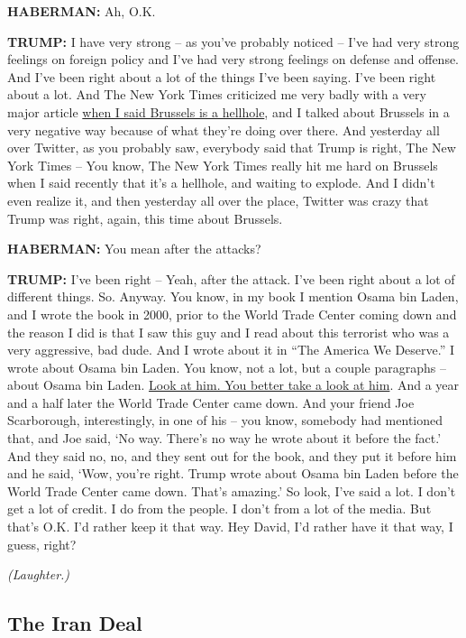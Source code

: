 \textbf{HABERMAN:} Ah, O.K.

\textbf{TRUMP:} I have very strong -- as you've probably noticed -- I've
had very strong feelings on foreign policy and I've had very strong
feelings on defense and offense. And I've been right about a lot of the
things I've been saying. I've been right about a lot. And The New York
Times criticized me very badly with a very major article
\href{http://www.nytimes.com/2016/01/28/world/europe/trump-finds-new-city-to-insult-brussels.html}{when
I said Brussels is a hellhole}, and I talked about Brussels in a very
negative way because of what they're doing over there. And yesterday all
over Twitter, as you probably saw, everybody said that Trump is right,
The New York Times -- You know, The New York Times really hit me hard on
Brussels when I said recently that it's a hellhole, and waiting to
explode. And I didn't even realize it, and then yesterday all over the
place, Twitter was crazy that Trump was right, again, this time about
Brussels.

\textbf{HABERMAN:} You mean after the attacks?

\textbf{TRUMP:} I've been right -- Yeah, after the attack. I've been
right about a lot of different things. So. Anyway. You know, in my book
I mention Osama bin Laden, and I wrote the book in 2000, prior to the
World Trade Center coming down and the reason I did is that I saw this
guy and I read about this terrorist who was a very aggressive, bad dude.
And I wrote about it in ``The America We Deserve.'' I wrote about Osama
bin Laden. You know, not a lot, but a couple paragraphs -- about Osama
bin Laden.
\href{http://www.nytimes.com/interactive/2016/us/elections/fact-check.html\#/factcheck-15?smid=tw-share}{Look
at him. You better take a look at him}. And a year and a half later the
World Trade Center came down. And your friend Joe Scarborough,
interestingly, in one of his -- you know, somebody had mentioned that,
and Joe said, `No way. There's no way he wrote about it before the
fact.' And they said no, no, and they sent out for the book, and they
put it before him and he said, `Wow, you're right. Trump wrote about
Osama bin Laden before the World Trade Center came down. That's
amazing.' So look, I've said a lot. I don't get a lot of credit. I do
from the people. I don't from a lot of the media. But that's O.K. I'd
rather keep it that way. Hey David, I'd rather have it that way, I
guess, right?

\emph{(Laughter.)}

\hypertarget{the-iran-deal}{%
\subsection{The Iran Deal}\label{the-iran-deal}}

